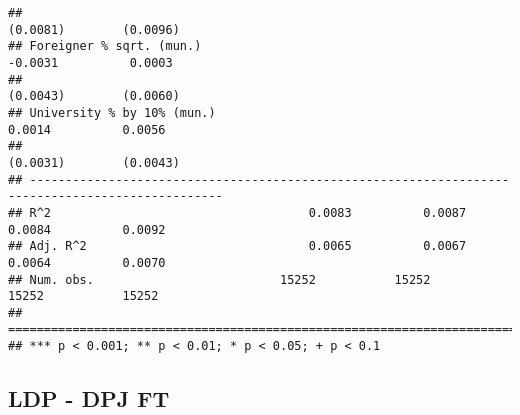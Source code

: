 \documentclass[
]{article}
\begin{document}
\begin{verbatim}
##                                                                       (0.0081)        (0.0096)   
## Foreigner % sqrt. (mun.)                                              -0.0031          0.0003    
##                                                                       (0.0043)        (0.0060)   
## University % by 10% (mun.)                                             0.0014          0.0056    
##                                                                       (0.0031)        (0.0043)   
## -------------------------------------------------------------------------------------------------
## R^2                                    0.0083          0.0087          0.0084          0.0092    
## Adj. R^2                               0.0065          0.0067          0.0064          0.0070    
## Num. obs.                          15252           15252           15252           15252         
## =================================================================================================
## *** p < 0.001; ** p < 0.01; * p < 0.05; + p < 0.1
\end{verbatim}

\hypertarget{ldp---dpj-ft-1}{%
\subsection{LDP - DPJ FT}\label{ldp---dpj-ft-1}}
\end{document}
